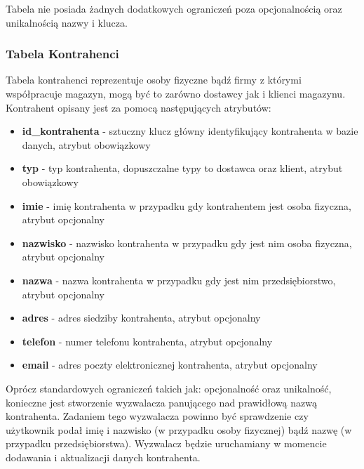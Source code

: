 Tabela nie posiada żadnych dodatkowych ograniczeń poza opcjonalnością oraz
unikalnością nazwy i klucza.

\subsubsection{Tabela Kontrahenci}
Tabela kontrahenci reprezentuje osoby fizyczne bądź firmy z którymi
współpracuje magazyn, mogą być to zarówno dostawcy jak i klienci magazynu. Kontrahent opisany
jest za pomocą następujących atrybutów:
\begin{itemize}
  \item \textbf{id\_kontrahenta} - sztuczny klucz główny identyfikujący
  kontrahenta w bazie danych, atrybut obowiązkowy
  \item \textbf{typ} - typ kontrahenta, dopuszczalne typy to dostawca oraz
  klient, atrybut obowiązkowy
  \item \textbf{imie} - imię kontrahenta w przypadku gdy kontrahentem jest osoba
  fizyczna, atrybut opcjonalny
  \item \textbf{nazwisko} - nazwisko kontrahenta w przypadku gdy jest nim osoba
  fizyczna, atrybut opcjonalny
  \item \textbf{nazwa} - nazwa kontrahenta w przypadku gdy jest nim
  przedsiębiorstwo, atrybut opcjonalny 
  \item \textbf{adres} - adres siedziby kontrahenta, atrybut opcjonalny
  \item \textbf{telefon} - numer telefonu kontrahenta, atrybut opcjonalny
  \item \textbf{email} - adres poczty elektronicznej kontrahenta, atrybut
  opcjonalny
\end{itemize}

Oprócz standardowych ograniczeń takich jak: opcjonalność oraz unikalność,
konieczne jest stworzenie wyzwalacza panującego nad prawidłową nazwą
kontrahenta. Zadaniem tego wyzwalacza powinno być sprawdzenie czy użytkownik
podał imię i nazwisko (w przypadku osoby fizycznej) bądź nazwę (w przypadku
przedsiębiorstwa). Wyzwalacz będzie uruchamiany w momencie dodawania i aktualizacji danych kontrahenta.

